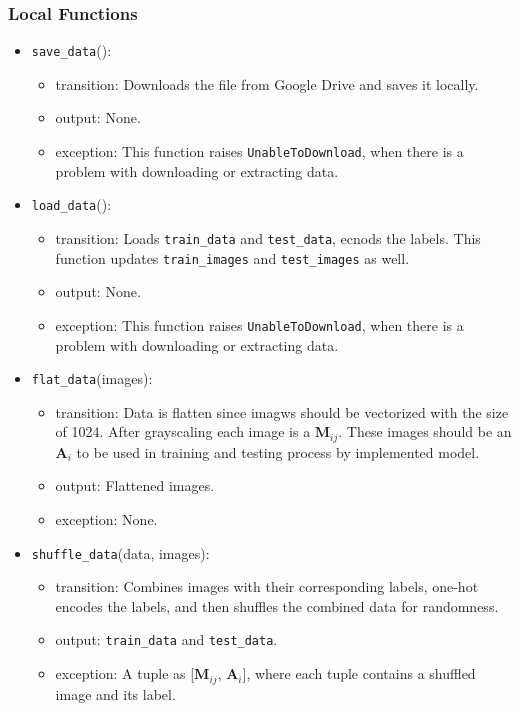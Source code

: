 \documentclass[12pt, titlepage]{article}
\def\code#1{\texttt{#1}}
\begin{document}
\subsubsection{Local Functions}
\begin{itemize}
  \item \code{save\_data}():
  \begin{itemize}
    \item transition: Downloads the file from Google Drive and saves it locally.
    \item output: None.
    \item exception: This function raises \code{UnableToDownload}, when there is 
    a problem with downloading or extracting data.
  \end{itemize}

  \item \code{load\_data}():
  \begin{itemize}
    \item transition: Loads \code{train\_data} and \code{test\_data}, ecnods the labels. 
    This function updates \code{train\_images} and \code{test\_images} as well.
    \item output: None.
    \item exception: This function raises \code{UnableToDownload}, when there is 
    a problem with downloading or extracting data.
  \end{itemize}

  \item \code{flat\_data}(images):
  \begin{itemize}
    \item transition: Data is flatten since imagws should be vectorized with the size of 1024. 
    After grayscaling each image is a $\mathbf{M}_{ij}$. These images should be an $\mathbf{A}_{i}$ to be used in 
    training and testing process by implemented model.
    \item output: Flattened images.
    \item exception: None.
  \end{itemize}

  \item \code{shuffle\_data}(data, images):
  \begin{itemize}
    \item transition: Combines images with their corresponding labels, one-hot encodes the labels, 
    and then shuffles the combined data for randomness.
    \item output: \code{train\_data} and \code{test\_data}.
    \item exception: A tuple as [$\mathbf{M}_{ij}$, $\mathbf{A}_{i}$], 
    where each tuple contains a shuffled image and its label.
  \end{itemize}

\end{itemize}
\end{document}
